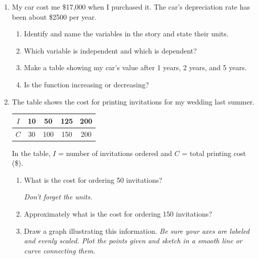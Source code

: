 \documentclass[12pt]{article}
\begin{document}
\begin{enumerate}

\item My car cost me \$17,000 when I purchased it.  The car's depreciation rate has been about \$2500 per year.

\begin{enumerate}
\item Identify and name the variables in the story and state their units.
\vfill
\item Which variable is independent and which is dependent?
\vfill
\item Make a table showing my car's value after 1 years, 2 years, and 5 years.
\vfill
\vfill
\vfill
\item Is the function increasing or decreasing?
\vfill
\end{enumerate}

\newpage

\item The table shows the cost for printing invitations for my wedding last summer.  

\begin{center}
\begin{tabular} {|c|c|c|c|c|} \hline
$I$ & 10 & 50 & 125 & 200 \\ \hline
$C$ & 30 & 100 & 150 & 200 \\ \hline
\end{tabular}
\end{center}

In the table, $I$ = number of invitations ordered and $C$ = total printing cost  (\$).

\begin{enumerate}
\item What is the cost for ordering 50 invitations?

\emph{Don't forget the units.}
\vfill
\item Approximately what is the cost for ordering 150 invitations?
\vfill
\item Draw a graph illustrating this information.  \emph{Be sure your axes are labeled and evenly scaled.  Plot the points given and sketch in a smooth line or curve connecting them.}


\end{enumerate}
\end{enumerate}
\end{document}
